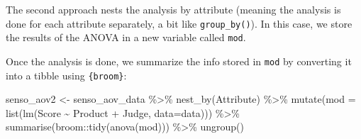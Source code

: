 \documentclass[
]{book}
\newenvironment{Shaded}{\begin{snugshade}}{\end{snugshade}}
\newcommand{\AttributeTok}[1]{\textcolor[rgb]{0.77,0.63,0.00}{#1}}
\newcommand{\ControlFlowTok}[1]{\textcolor[rgb]{0.13,0.29,0.53}{\textbf{#1}}}
\newcommand{\FunctionTok}[1]{\textcolor[rgb]{0.00,0.00,0.00}{#1}}
\newcommand{\NormalTok}[1]{#1}
\newcommand{\OtherTok}[1]{\textcolor[rgb]{0.56,0.35,0.01}{#1}}
\newcommand{\SpecialCharTok}[1]{\textcolor[rgb]{0.00,0.00,0.00}{#1}}
\newcommand{\StringTok}[1]{\textcolor[rgb]{0.31,0.60,0.02}{#1}}
\begin{document}
\begin{Shaded}
\end{Shaded}

The second approach nests the analysis by attribute (meaning the analysis is done for each attribute separately, a bit like \texttt{group\_by()}). In this case, we store the results of the ANOVA in a new variable called \texttt{mod}.

Once the analysis is done, we summarize the info stored in \texttt{mod} by converting it into a tibble using \texttt{\{broom\}}:

\begin{Shaded}
\begin{Highlighting}[]
\NormalTok{senso\_aov2 }\OtherTok{\textless{}{-}}\NormalTok{ senso\_aov\_data }\SpecialCharTok{\%\textgreater{}\%} 
  \FunctionTok{nest\_by}\NormalTok{(Attribute) }\SpecialCharTok{\%\textgreater{}\%} 
  \FunctionTok{mutate}\NormalTok{(}\AttributeTok{mod =} \FunctionTok{list}\NormalTok{(}\FunctionTok{lm}\NormalTok{(Score }\SpecialCharTok{\textasciitilde{}}\NormalTok{ Product }\SpecialCharTok{+}\NormalTok{ Judge, }\AttributeTok{data=}\NormalTok{data))) }\SpecialCharTok{\%\textgreater{}\%} 
  \FunctionTok{summarise}\NormalTok{(broom}\SpecialCharTok{::}\FunctionTok{tidy}\NormalTok{(}\FunctionTok{anova}\NormalTok{(mod))) }\SpecialCharTok{\%\textgreater{}\%} 
  \FunctionTok{ungroup}\NormalTok{()}
\end{Highlighting}
\end{Shaded}
\end{document}
